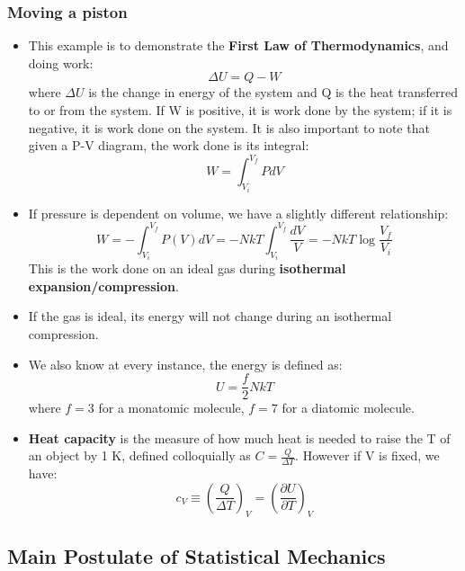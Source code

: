 \documentclass[12pt, letterpaper, twoside]{article}
\begin{document}
\subsubsection{Moving a piston}

\begin{itemize}
    \item This example is to demonstrate the \textbf{First Law of Thermodynamics}, and doing work:
    \begin{equation}
        \Delta U = Q - W
    \end{equation}
    where $\Delta U$ is the change in energy of the system and Q is the heat transferred to or from the system. If W is positive, it is work done by the system; if it is negative, it is work done on the system. It is also important to note that given a P-V diagram, the work done is its integral:
    \begin{equation}
        W = \int_{V_i}^{V_f}P dV
    \end{equation}
    \item If pressure is dependent on volume, we have a slightly different relationship:
    \begin{equation*}
        W = -\int_{V_i}^{V_f}P(V)dV = -NkT\int_{V_i}^{V_f}\frac{dV}{V} = -NkT\log{\frac{V_f}{V_i}}
    \end{equation*}
    This is the work done on an ideal gas during \textbf{isothermal expansion/compression}.
    \item If the gas is ideal, its energy will not change during an isothermal compression.
    \item We also know at every instance, the energy is defined as:
    \begin{equation*}
        U = \frac{f}{2}NkT
    \end{equation*}
    where $f = 3$ for a monatomic molecule, $f = 7$ for a diatomic molecule.
    \item \textbf{Heat capacity} is the measure of how much heat is needed to raise the T of an object by 1 K, defined colloquially as $C = \frac{Q}{\Delta T}$. However if V is fixed, we have:
    \begin{equation}
        c_V \equiv (\frac{Q}{\Delta T})_V = (\frac{\partial U}{\partial T})_V
    \end{equation}
\end{itemize}
\subsection{Main Postulate of Statistical Mechanics}
\end{document}

